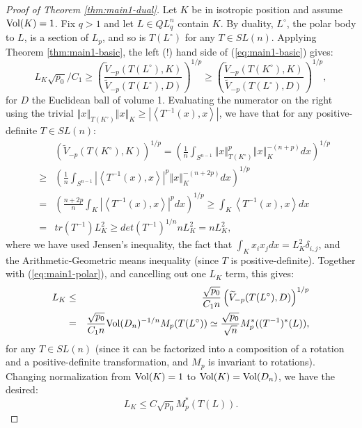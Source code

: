 \documentclass[12pt,oneside]{amsart}
\theoremstyle{definition}
\theoremstyle{remark}
\theoremstyle{proof}
\numberwithin{equation}{section}
\newcommand{\norm}[1]{\left\Vert#1\right\Vert}
\newcommand{\abs}[1]{\left\vert#1\right\vert}
\newcommand{\brac}[1]{\left(#1\right)}
\newcommand{\scalar}[1]{\left \langle #1 \right \rangle}
\newcommand{\Vol}[1]{\textnormal{Vol} (#1)}
\newcommand{\VolRatio}[2]{\brac{\frac{\Vol{#1}}{\Vol{#2}}}^{1/n}}
\begin{document}
\begin{proof}[Proof of Theorem \ref{thm:main1-dual}]
Let $K$ be in isotropic position and assume $\Vol{K}=1$. Fix $q>1$
and let $L \in QL_q^n$ contain $K$. By duality, $L^\circ$, the
polar body to $L$, is a section of $L_p$, and so is $T(L^\circ)$
for any $T \in SL(n)$. Applying Theorem \ref{thm:main1-basic}, the
left (!) hand side of (\ref{eq:main1-basic}) gives:
\begin{equation} \label{eq:main1-polar}
L_K  \sqrt{p_0} / C_1 \geq \brac{ \frac{
\widetilde{V}_{-p}(T(L^\circ),K) }
{\widetilde{V}_{-p}(T(L^\circ),D)}}^{1/p} \geq \brac{ \frac{
\widetilde{V}_{-p}(T(K^\circ),K) }
{\widetilde{V}_{-p}(T(L^\circ),D)}}^{1/p},
\end{equation}
for $D$ the Euclidean ball of volume 1. Evaluating the numerator
on the right using the trivial $\norm{x}_{T(K^\circ)} \norm{x}_K
\geq \abs{\scalar{T^{-1}(x),x}}$, we have that for any
positive-definite $T \in SL(n)$:
\begin{eqnarray}
\nonumber & & \brac{ \widetilde{V}_{-p}(T(K^\circ),K) }^{1/p} =
\brac{\frac{1}{n} \int_{S^{n-1}} \norm{x}^p_{T(K^\circ)}
\norm{x}_K^{-(n+p)} dx}^{1/p} \\
\nonumber & \geq & \brac{\frac{1}{n} \int_{S^{n-1}}
\abs{\scalar{T^{-1}(x),x}}^p \norm{x}_K^{-(n+2p)}dx}^{1/p} \\
\nonumber & = & \brac{\frac{n+2p}{n} \int_K
\abs{\scalar{T^{-1}(x),x}}^p dx}^{1/p} \geq \int_K
\scalar{T^{-1}(x),x} dx \\
\nonumber & = & tr(T^{-1}) L_K^2 \geq det(T^{-1})^{1/n} n L_K^2 =
n L_K^2,
\end{eqnarray}
where we have used Jensen's inequality, the fact that $\int_K x_i
x_j dx = L_K^2 \delta_{i,j}$, and the Arithmetic-Geometric means
inequality (since $T$ is positive-definite). Together with
(\ref{eq:main1-polar}), and cancelling out one $L_K$ term, this
gives:
\begin{eqnarray}
\nonumber L_K & \leq & \frac{\sqrt{p_0}}{C_1 n}
\brac{\widetilde{V}_{-p}(T(L^\circ),D)}^{1/p} \\
\nonumber & = & \frac{\sqrt{p_0}}{C_1 n} \Vol{D_n}^{-1/n}
M_p(T(L^\circ)) \simeq \frac{\sqrt{p_0}}{\sqrt{n}}
M^*_p((T^{-1})^*(L)),
\end{eqnarray}
for any $T \in SL(n)$ (since it can be factorized into a
composition of a rotation and a positive-definite transformation,
and $M_p$ is invariant to rotations). Changing normalization from
$\Vol{K}=1$ to $\Vol{K}=\Vol{D_n}$, we have the desired:
\[
L_K \leq C \sqrt{p_0} M^*_p(T(L)).
\]
\end{proof}
\end{document}
